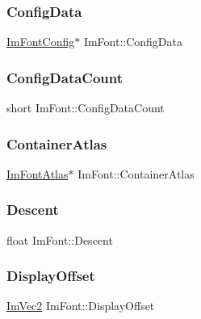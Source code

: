 \hypertarget{struct_im_font_afa4eb6cfb979ffa120e9795f328623a1}{}\label{struct_im_font_afa4eb6cfb979ffa120e9795f328623a1} 
\subsubsection{\texorpdfstring{Config\+Data}{ConfigData}}
{\footnotesize\ttfamily \hyperlink{struct_im_font_config}{Im\+Font\+Config}$\ast$ Im\+Font\+::\+Config\+Data}

\hypertarget{struct_im_font_a4a30fc7711d628ad582ccb3188a51ddd}{}\label{struct_im_font_a4a30fc7711d628ad582ccb3188a51ddd} 
\subsubsection{\texorpdfstring{Config\+Data\+Count}{ConfigDataCount}}
{\footnotesize\ttfamily short Im\+Font\+::\+Config\+Data\+Count}

\hypertarget{struct_im_font_a8a5e0df6be5e3cabe91ae830524db960}{}\label{struct_im_font_a8a5e0df6be5e3cabe91ae830524db960} 
\subsubsection{\texorpdfstring{Container\+Atlas}{ContainerAtlas}}
{\footnotesize\ttfamily \hyperlink{struct_im_font_atlas}{Im\+Font\+Atlas}$\ast$ Im\+Font\+::\+Container\+Atlas}

\hypertarget{struct_im_font_abcca12aa908bf7105433e7db6088a5e5}{}\label{struct_im_font_abcca12aa908bf7105433e7db6088a5e5} 
\subsubsection{\texorpdfstring{Descent}{Descent}}
{\footnotesize\ttfamily float Im\+Font\+::\+Descent}

\hypertarget{struct_im_font_af9b95f3df0b6d45f45903d82301d7f84}{}\label{struct_im_font_af9b95f3df0b6d45f45903d82301d7f84} 
\subsubsection{\texorpdfstring{Display\+Offset}{DisplayOffset}}
{\footnotesize\ttfamily \hyperlink{struct_im_vec2}{Im\+Vec2} Im\+Font\+::\+Display\+Offset}


